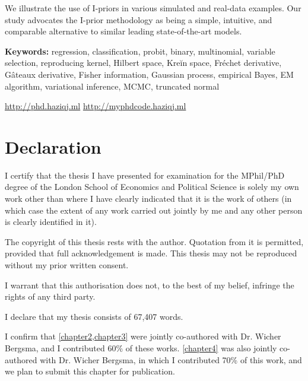 \documentclass[11pt,twoside,openright,showframe]{report}
\begin{document}
We illustrate the use of I-priors in various simulated and real-data examples. 
Our study advocates the I-prior methodology as being a simple, intuitive, and comparable alternative to similar leading state-of-the-art models. 


\vspace{1em}
{\noindent\textbf{Keywords:} 
	regression, classification, probit, binary, multinomial, variable selection, reproducing kernel, Hilbert space, Kreĭn space, Fréchet derivative, Gâteaux derivative, Fisher information, Gaussian process, empirical Bayes, EM algorithm, variational inference, MCMC, truncated normal
}

\vfill

\begin{center}
  \url{http://phd.haziqj.ml} \textbullet{} \url{http://myphdcode.haziqj.ml}
\end{center}

\chapter*{Declaration} 

I certify that the thesis I have presented for examination for the MPhil/PhD degree of the London School of Economics and Political Science is solely my own work other than where I have clearly indicated that it is the work of others (in which case the extent of any work carried out jointly by me and any other person is clearly identified in it).

The copyright of this thesis rests with the author. Quotation from it is permitted, provided that full acknowledgement is made. 
This thesis may not be reproduced without my prior written consent.

I warrant that this authorisation does not, to the best of my belief, infringe the rights of any third party.

I declare that my thesis consists of 67,407 words.

I confirm that \cref{chapter2,chapter3} were jointly co-authored with Dr. Wicher Bergsma, and I contributed 60\% of these works.
\cref{chapter4} was also jointly co-authored with Dr. Wicher Bergsma, in which I contributed 70\% of this work, and we plan to submit this chapter for publication.
\end{document}
